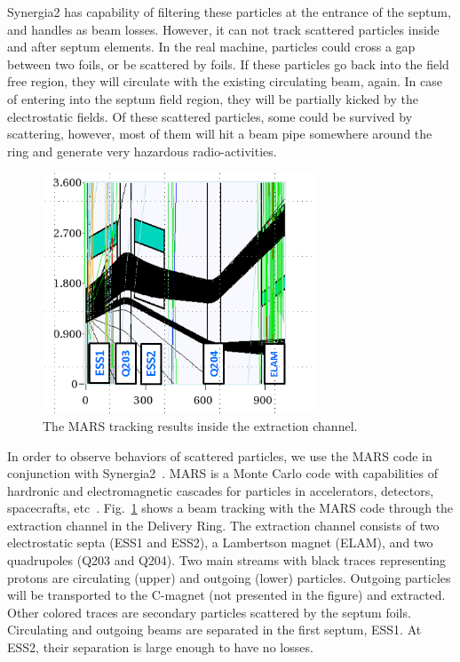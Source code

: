 \documentclass[aps,prstab,onecolumn,preprint]{revtex4-1}
\begin{document}
Synergia2 has capability of filtering these particles at the entrance of the septum, and handles as beam losses. However, it can not track scattered particles inside and after septum elements. In the real machine, particles could cross a gap between two foils, or be scattered by foils. If these particles go back into the field free region, they will circulate with the existing circulating beam, again. In case of entering into the septum field region, they will be partially kicked by the electrostatic fields. Of these scattered particles, some could be survived by scattering, however, most of them will hit a beam pipe somewhere around the ring and generate very hazardous radio-activities.

\begin{figure}[!tbp]
  \includegraphics[width=3.2in]{img/fig_beamloss1}
  \caption{\label{fig:beamloss1}The MARS tracking results inside the extraction channel.}
\end{figure}

In order to observe behaviors of scattered particles, we use the MARS code in conjunction with Synergia2~\cite{mars1}. MARS is a Monte Carlo code with capabilities of hardronic and electromagnetic cascades for particles in accelerators, detectors, spacecrafts, etc~\cite{mars2}. Fig.~\ref{fig:beamloss1} shows a beam tracking with the MARS code through the extraction channel in the Delivery Ring. The extraction channel consists of two electrostatic septa (ESS1 and ESS2), a Lambertson magnet (ELAM), and two quadrupoles (Q203 and Q204). Two main streams with black traces representing protons are circulating (upper) and outgoing (lower) particles. Outgoing particles will be transported to the C-magnet (not presented in the figure) and extracted. Other colored traces are secondary particles scattered by the septum foils. Circulating and outgoing beams are separated in the first septum, ESS1. At ESS2, their separation is large enough to have no losses. 
\end{document}
